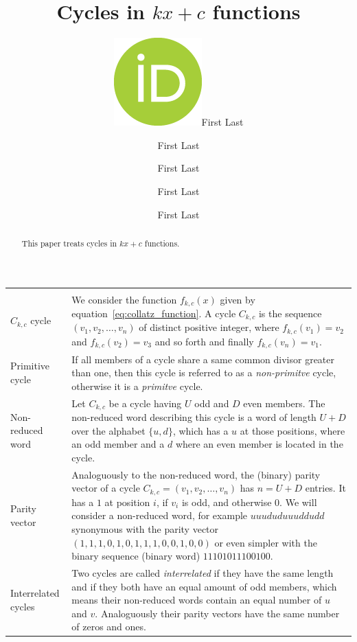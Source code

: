 \documentclass[12pt]{amsart}
\title[Cycles in kx+c functions]{Cycles in $kx+c$ functions}
\author[F.\ Last1]{\href{https://orcid.org/0000-0000-0000-0000}{\includegraphics[scale=0.06]{orcid.png}}\hspace{1mm}First Last}
\author[F.\ Last2]{First Last}
\author[F.\ Last3]{First Last}
\author[F.\ Last4]{First Last}
\author[F.\ Last5]{First Last}
\theoremstyle{definition}
\begin{document}
	
\begingroup
\let\MakeUppercase\relax
\maketitle
\endgroup

\begin{abstract}
This paper treats cycles in $kx+c$ functions. 
\end{abstract}

\newpage
{\renewcommand{\arraystretch}{1.8}
\begin{table}[H]
	\centering
	\begin{tabular}{|P{1.4cm} p{13.4cm}|}
		\hline
		\\
		$C_{k,c}$ cycle & We consider the function $f_{k,c}(x)$ given by equation~\ref{eq:collatz_function}. A cycle $C_{k,c}$ is the sequence $(v_1, v_2,\ldots, v_n)$ of distinct positive integer, where $f_{k,c}(v_1)=v_2$ and $f_{k,c}(v_2)=v_3$ and so forth and finally $f_{k,c}(v_n)=v_1$.
		\\
		Primitive cycle & If all members of a cycle share a same common divisor greater than one, then this cycle is referred to as a \textit{non-primitve} cycle, otherwise it is a \textit{primitve} cycle.
		\\
		Non-reduced word & Let $C_{k,c}$ be a cycle having $U$ odd and $D$ even members. The non-reduced word describing this cycle is a word of length $U+D$ over the alphabet $\{u,d\}$, which has a $u$ at those positions, where an odd member and a $d$ where an even member is located in the cycle.
		\\
		Parity vector & Analoguously to the non-reduced word, the (binary) parity vector of a cycle $C_{k,c}=(v_1,v_2,\ldots,v_n)$ has $n=U+D$ entries. It has a $1$ at position $i$, if $v_i$ is odd, and otherwise $0$. We will consider a non-reduced word, for example $uuududuuuddudd$ synonymous with the parity vector $(1,1,1,0,1,0,1,1,1,0,0,1,0,0)$ or even simpler with the binary sequence (binary word) $11101011100100$.
		\\
		Interrelated cycles & Two cycles are called \textit{interrelated} if they have the same length and if they both have an equal amount of odd members, which means their non-reduced words contain an equal number of $u$ and $v$. Analoguously their parity vectors have the same number of zeros and ones. 
		\\ \hline
	\end{tabular}
\end{table}}
\end{document}
